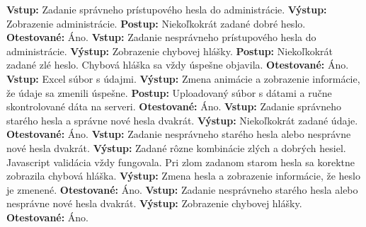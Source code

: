 \documentclass[12pt,a4paper]{report}
\begin{document}
\begin{flushleft}
\textbf{Vstup:} Zadanie správneho prístupového hesla do administrácie.\linebreak
\textbf{Výstup:} Zobrazenie administrácie.\linebreak
\textbf{Postup:} Niekoľkokrát zadané dobré heslo. \linebreak
\textbf{Otestované:} Áno.\linebreak
\linebreak
\textbf{Vstup:} Zadanie nesprávneho prístupového hesla do administrácie.\linebreak
\textbf{Výstup:} Zobrazenie chybovej hlášky.\linebreak
\textbf{Postup:} Niekoľkokrát zadané zlé heslo. Chybová hláška sa vždy úspešne objavila. \linebreak
\textbf{Otestované:} Áno.\linebreak
\linebreak
\textbf{Vstup:} Excel súbor s údajmi.\linebreak
\textbf{Výstup:} Zmena animácie a zobrazenie informácie, že údaje sa zmenili úspešne.\linebreak
\textbf{Postup:} Uploadovaný súbor s dátami a ručne skontrolované dáta na serveri. \linebreak
\textbf{Otestované:} Áno.\linebreak
\linebreak
\textbf{Vstup:} Zadanie správneho starého hesla a správne nové hesla dvakrát.\linebreak
\textbf{Výstup:} Niekoľkokrát zadané údaje.\linebreak
\textbf{Otestované:} Áno.\linebreak
\linebreak
\textbf{Vstup:} Zadanie nesprávneho starého hesla alebo nesprávne nové hesla dvakrát.\linebreak
\textbf{Výstup:} Zadané rôzne kombinácie zlých a dobrých hesiel. Javascript validácia vždy fungovala. Pri zlom zadanom starom hesla sa korektne zobrazila chybová hláška. \linebreak
\textbf{Výstup:} Zmena hesla a zobrazenie informácie, že heslo je zmenené.\linebreak
\textbf{Otestované:} Áno.\linebreak
\linebreak
\textbf{Vstup:} Zadanie nesprávneho starého hesla alebo nesprávne nové hesla dvakrát.\linebreak
\textbf{Výstup:} Zobrazenie chybovej hlášky.\linebreak
\textbf{Otestované:} Áno.\linebreak
\end{flushleft}
\end{document}
